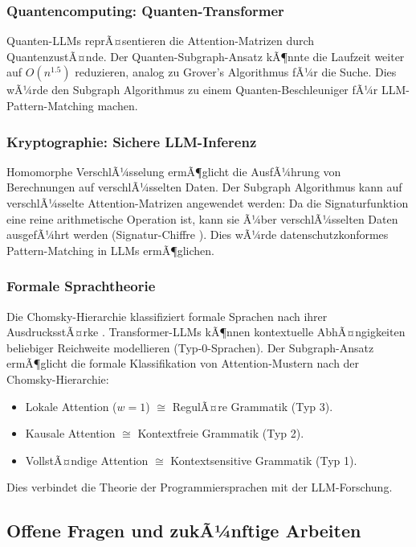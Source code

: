 ﻿\documentclass[a4paper,12pt]{article}
\theoremstyle{definition}
\begin{document}
\subsubsection{Quantencomputing: Quanten-Transformer}

Quanten-LLMs \cite{gao2021enhancing} reprÃ¤sentieren die Attention-Matrizen
durch QuantenzustÃ¤nde. Der Quanten-Subgraph-Ansatz kÃ¶nnte die Laufzeit
weiter auf $O(n^{1.5})$ reduzieren, analog zu Grover's Algorithmus fÃ¼r
die Suche. Dies wÃ¼rde den Subgraph Algorithmus zu einem Quanten-Beschleuniger
fÃ¼r LLM-Pattern-Matching machen.

\subsubsection{Kryptographie: Sichere LLM-Inferenz}

Homomorphe VerschlÃ¼sselung ermÃ¶glicht die AusfÃ¼hrung von Berechnungen
auf verschlÃ¼sselten Daten. Der Subgraph Algorithmus kann auf
verschlÃ¼sselte Attention-Matrizen angewendet werden: Da die Signaturfunktion
eine reine arithmetische Operation ist, kann sie Ã¼ber verschlÃ¼sselten
Daten ausgefÃ¼hrt werden (Signatur-Chiffre \cite{epp2026sigchiffre}).
Dies wÃ¼rde datenschutzkonformes Pattern-Matching in LLMs ermÃ¶glichen.

\subsubsection{Formale Sprachtheorie}

Die Chomsky-Hierarchie klassifiziert formale Sprachen nach ihrer
AusdrucksstÃ¤rke \cite{chomsky1956three}. Transformer-LLMs kÃ¶nnen kontextuelle
AbhÃ¤ngigkeiten beliebiger Reichweite modellieren (Typ-0-Sprachen).
Der Subgraph-Ansatz ermÃ¶glicht die formale Klassifikation von
Attention-Mustern nach der Chomsky-Hierarchie:
\begin{itemize}
	\item Lokale Attention ($w = 1$) $\cong$ RegulÃ¤re Grammatik (Typ 3).
	\item Kausale Attention $\cong$ Kontextfreie Grammatik (Typ 2).
	\item VollstÃ¤ndige Attention $\cong$ Kontextsensitive Grammatik (Typ 1).
\end{itemize}
Dies verbindet die Theorie der Programmiersprachen mit der LLM-Forschung.

\subsection{Offene Fragen und zukÃ¼nftige Arbeiten}
\end{document}
